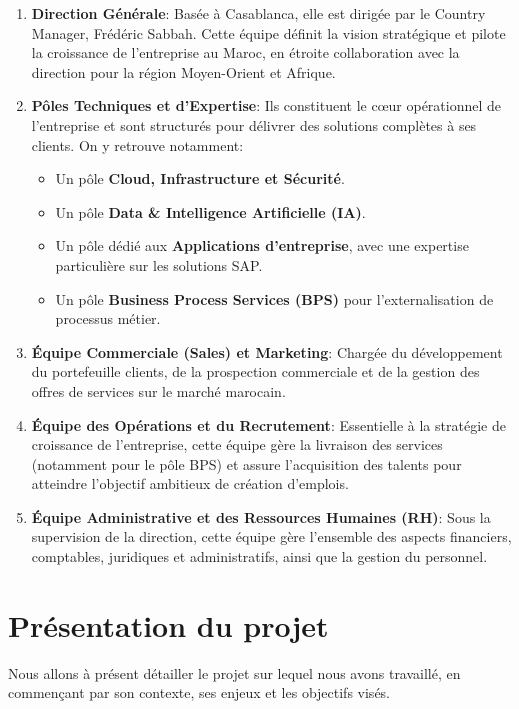 \begin{enumerate}
    \item \textbf{Direction Générale}: Basée à Casablanca, elle est dirigée par le Country Manager, Frédéric Sabbah. Cette équipe définit la vision stratégique et pilote la croissance de l'entreprise au Maroc, en étroite collaboration avec la direction pour la région Moyen-Orient et Afrique.

    \item \textbf{Pôles Techniques et d'Expertise}: Ils constituent le cœur opérationnel de l'entreprise et sont structurés pour délivrer des solutions complètes à ses clients. On y retrouve notamment:
        \begin{itemize}
		\renewcommand{\labelitemi}{—}
            \item Un pôle \textbf{Cloud, Infrastructure et Sécurité}.
            \item Un pôle \textbf{Data \& Intelligence Artificielle (IA)}.
            \item Un pôle dédié aux \textbf{Applications d'entreprise}, avec une expertise particulière sur les solutions SAP.
            \item Un pôle \textbf{Business Process Services (BPS)} pour l'externalisation de processus métier.
        \end{itemize}

    \item \textbf{Équipe Commerciale (Sales) et Marketing}: Chargée du développement du portefeuille clients, de la prospection commerciale et de la gestion des offres de services sur le marché marocain.

    \item \textbf{Équipe des Opérations et du Recrutement}: Essentielle à la stratégie de croissance de l'entreprise, cette équipe gère la livraison des services (notamment pour le pôle BPS) et assure l'acquisition des talents pour atteindre l'objectif ambitieux de création d'emplois.

    \item \textbf{Équipe Administrative et des Ressources Humaines (RH)}: Sous la supervision de la direction, cette équipe gère l'ensemble des aspects financiers, comptables, juridiques et administratifs, ainsi que la gestion du personnel.
\end{enumerate}



\section{Présentation du projet}
Nous allons à présent détailler le projet sur lequel nous avons travaillé, en commençant par
son contexte, ses enjeux et les objectifs visés.
